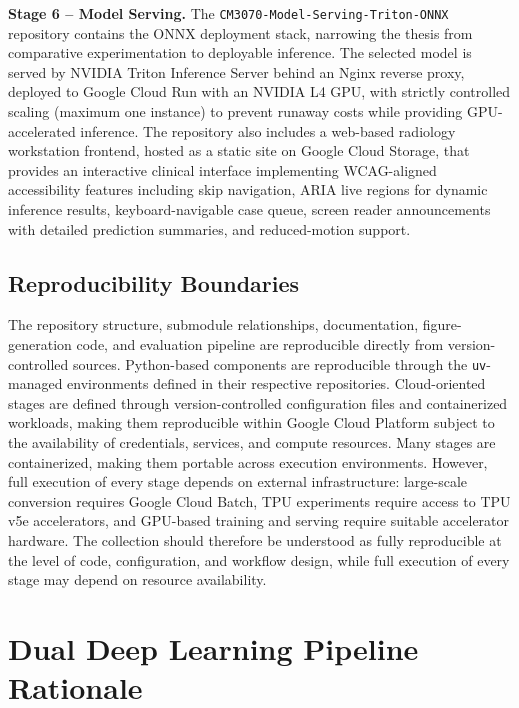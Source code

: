 \documentclass[justified,notoc,openany]{tufte-book}
\begin{document}
\textbf{Stage 6 -- Model Serving.} The \texttt{CM3070-Model-Serving-Triton-ONNX} repository contains the ONNX deployment stack, narrowing the thesis from comparative experimentation to deployable inference. The selected model is served by NVIDIA Triton Inference Server behind an Nginx reverse proxy, deployed to Google Cloud Run with an NVIDIA L4 GPU, with strictly controlled scaling (maximum one instance) to prevent runaway costs while providing GPU-accelerated inference. The repository also includes a web-based radiology workstation frontend, hosted as a static site on Google Cloud Storage, that provides an interactive clinical interface implementing WCAG-aligned accessibility features including skip navigation, ARIA live regions for dynamic inference results, keyboard-navigable case queue, screen reader announcements with detailed prediction summaries, and reduced-motion support.

\subsection{Reproducibility Boundaries}\label{reproducibility-boundaries}

The repository structure, submodule relationships, documentation, figure-generation code, and evaluation pipeline are reproducible directly from version-controlled sources. Python-based components are reproducible through the \texttt{uv}-managed environments defined in their respective repositories. Cloud-oriented stages are defined through version-controlled configuration files and containerized workloads, making them reproducible within Google Cloud Platform subject to the availability of credentials, services, and compute resources. Many stages are containerized, making them portable across execution environments. However, full execution of every stage depends on external infrastructure: large-scale conversion requires Google Cloud Batch, TPU experiments require access to TPU v5e accelerators, and GPU-based training and serving require suitable accelerator hardware. The collection should therefore be understood as fully reproducible at the level of code, configuration, and workflow design, while full execution of every stage may depend on resource availability.

\section{Dual Deep Learning Pipeline Rationale}\label{dual-deep-learning-pipeline-rationale}
\end{document}
